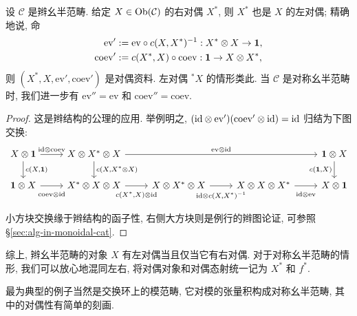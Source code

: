 \begin{lemma}\label{prop:braided-dual}
	设 $\mathcal{C}$ 是辫幺半范畴. 给定 $X \in \operatorname{Ob}(\mathcal{C})$ 的右对偶 $X^*$, 则 $X^*$ 也是 $X$ 的左对偶; 精确地说, 命
	\begin{align*}
		\mathrm{ev}' & := \mathrm{ev} \circ c(X, X^*)^{-1}: X^* \otimes X \to \bm{1}, \\
		\mathrm{coev}' & := c(X^*, X) \circ \mathrm{coev}: \bm{1} \to X \otimes X^* ,
	\end{align*}
	则 $(X^*, X, \mathrm{ev}', \mathrm{coev}')$ 是对偶资料. 左对偶 ${}^* X$ 的情形类此. 当 $\mathcal{C}$ 是对称幺半范畴时, 我们进一步有 $\mathrm{ev}'' = \mathrm{ev}$ 和 $\mathrm{coev}'' = \mathrm{coev}$.
\end{lemma}
\begin{proof}
	这是辫结构的公理的应用. 举例明之, $(\mathrm{id} \otimes \mathrm{ev}') (\mathrm{coev}' \otimes \mathrm{id}) = \mathrm{id}$ 归结为下图交换:
	\[\begin{tikzcd}
		X \otimes \munit \arrow[d, "{c(X, \munit)}"] \arrow[r, "{\identity \otimes \mathrm{coev}}"] & X \otimes X^* \otimes X \arrow[d, "{c(X, X^* \otimes X)}"] \arrow[rrr, "{\mathrm{ev} \otimes \identity}"] & & & \munit \otimes X \arrow[d, "{c(\munit, X)}"'] \\
		\munit \otimes X \arrow[r, "{\mathrm{coev} \otimes \identity}"' inner sep=0.6em] & X^* \otimes X \otimes X \arrow[r, "{c(X^*, X) \otimes \identity}"' inner sep=0.6em] & X \otimes X^* \otimes X \arrow[r, "{\identity \otimes c(X, X^*)^{-1}}"' inner sep=0.6em] & X \otimes X \otimes X^* \arrow[r, "{\identity \otimes \mathrm{ev}}"' inner sep=0.6em] & X \otimes \munit
	\end{tikzcd}\]
	小方块交换缘于辫结构的函子性, 右侧大方块则是例行的辫图论证, 可参照 \S\ref{sec:alg-in-monoidal-cat}.
\end{proof}

综上, 辫幺半范畴的对象 $X$ 有左对偶当且仅当它有右对偶. 对于对称幺半范畴的情形, 我们可以放心地混同左右, 将对偶对象和对偶态射统一记为 $X^*$ 和 $f^*$.

最为典型的例子当然是交换环上的模范畴, 它对模的张量积构成对称幺半范畴, 其中的对偶性有简单的刻画.

